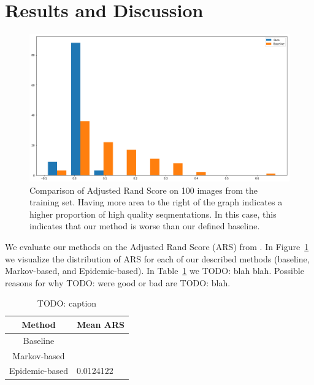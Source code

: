 \documentclass[twocolumn]{article}
\newcommand{\todo}[1]{}
\renewcommand{\todo}[1]{{\color{red} TODO: {#1}}}
\newcommand{\seclab}[1]{\label{sec:#1}}
\newcommand{\figref}[1]{Figure~\ref{fig:#1}}
\newcommand{\figlab}[1]{\label{fig:#1}}
\newcommand{\tblref}[1]{Table~\ref{tbl:#1}}
\newcommand{\tbllab}[1]{\label{tbl:#1}}
\begin{document}
\section{Results and Discussion}\seclab{results}

\begin{figure}
  \centering
  \includegraphics[width=\linewidth]{figs/bars.png}
  \caption{Comparison of Adjusted Rand Score on 100 images from the training
  set. Having more area to the right of the graph indicates a higher proportion
  of high quality seqmentations. In this case, this indicates that our method is
  worse than our defined baseline.
  }
  \figlab{bars}
\end{figure}

We evaluate our methods on the Adjusted Rand Score (ARS) from
\cite{unnikrishnan2005measure}. In \figref{bars} we visualize the distribution
of ARS for each of our described methods (baseline, Markov-based, and
Epidemic-based). In \tblref{ars} we \todo{blah blah}. Possible reasons for why
\todo{were good or bad} are \todo{blah}.

\begin{table}
    \centering
    \caption{\todo{caption}}
    \tbllab{ars}

    \begin{tabular}{c|l}
        Method & Mean ARS \\ \hline
        Baseline & ~ \\
        Markov-based & ~ \\
        Epidemic-based & 0.0124122
    \end{tabular}
\end{table}
\end{document}
